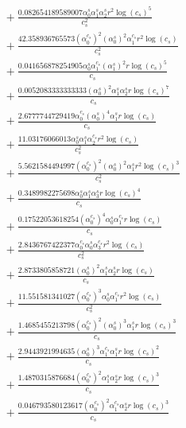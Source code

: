 \documentclass[10pt]{article}
\begin{document}
\begin{align*}
&{}  + \frac{0.082654189589007 \alpha_{0}^s \alpha_{1}^s \alpha_{2}^s r^{2} \log{\left(c_{s} \right)}^{5}}{c_{s}^{2}} \\
&{}  + \frac{42.358936765573 \left(\alpha_{0}^{c_s}\right)^{2} \left(\alpha_{0}^s\right)^{2} \alpha_{1}^{c_s} r^{2} \log{\left(c_{s} \right)}}{c_{s}^{2}} \\
&{}  + \frac{0.041656878254905 \alpha_{0}^s \alpha_{1}^{c_s} \left(\alpha_{1}^s\right)^{2} r \log{\left(c_{s} \right)}^{5}}{c_{s}} \\
&{}  + \frac{0.0052083333333333 \left(\alpha_{0}^s\right)^{2} \alpha_{1}^s \alpha_{2}^s r \log{\left(c_{s} \right)}^{7}}{c_{s}} \\
&{}  + \frac{2.6777744729419 \alpha_{0}^{c_s} \left(\alpha_{0}^s\right)^{4} \alpha_{1}^s r \log{\left(c_{s} \right)}}{c_{s}} \\
&{}  + \frac{11.03176066013 \alpha_{0}^s \alpha_{1}^s \alpha_{2}^{c_s} r^{2} \log{\left(c_{s} \right)}}{c_{s}^{2}} \\
&{}  + \frac{5.5621584494997 \left(\alpha_{0}^{c_s}\right)^{2} \left(\alpha_{0}^s\right)^{2} \alpha_{1}^s r^{2} \log{\left(c_{s} \right)}^{3}}{c_{s}^{2}} \\
&{}  + \frac{0.3489982275698 \alpha_{0}^s \alpha_{1}^s \alpha_{3}^s r \log{\left(c_{s} \right)}^{4}}{c_{s}} \\
&{}  + \frac{0.17522053618254 \left(\alpha_{0}^{c_s}\right)^{4} \alpha_{0}^s \alpha_{1}^{c_s} r \log{\left(c_{s} \right)}}{c_{s}} \\
&{}  + \frac{2.8436767422377 \alpha_{0}^{c_s} \alpha_{0}^s \alpha_{3}^{c_s} r^{2} \log{\left(c_{s} \right)}}{c_{s}^{2}} \\
&{}  + \frac{2.8733805858721 \left(\alpha_{0}^s\right)^{2} \alpha_{1}^s \alpha_{2}^s r \log{\left(c_{s} \right)}}{c_{s}} \\
&{}  + \frac{11.551581341027 \left(\alpha_{0}^{c_s}\right)^{3} \alpha_{0}^s \alpha_{1}^{c_s} r^{2} \log{\left(c_{s} \right)}}{c_{s}^{2}} \\
&{}  + \frac{1.4685455213798 \left(\alpha_{0}^{c_s}\right)^{2} \left(\alpha_{0}^s\right)^{3} \alpha_{1}^s r \log{\left(c_{s} \right)}^{3}}{c_{s}} \\
&{}  + \frac{2.9443921994635 \left(\alpha_{0}^s\right)^{3} \alpha_{1}^{c_s} \alpha_{1}^s r \log{\left(c_{s} \right)}^{2}}{c_{s}} \\
&{}  + \frac{1.4870315876684 \left(\alpha_{0}^{c_s}\right)^{2} \alpha_{1}^s \alpha_{2}^s r \log{\left(c_{s} \right)}^{3}}{c_{s}} \\
&{}  + \frac{0.046793580123617 \left(\alpha_{0}^{c_s}\right)^{2} \alpha_{1}^{c_s} \alpha_{2}^s r \log{\left(c_{s} \right)}^{3}}{c_{s}} \\

\end{align*}
\end{document}
